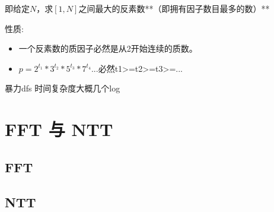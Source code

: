 即给定$N$，求$[1,N]$之间最大的反素数**（即拥有因子数目最多的数）**

性质:
\begin{itemize}
	\item 一个反素数的质因子必然是从2开始连续的质数。 
	\item $p=2^{t_1} * 3^{t_2} * 5^{t_3} * 7^{t_4}$...必然t1>=t2>=t3>=...
\end{itemize}

暴力dfs    时间复杂度大概几个log







\section{FFT 与 NTT}

\subsection{FFT}

\subsection{NTT}









